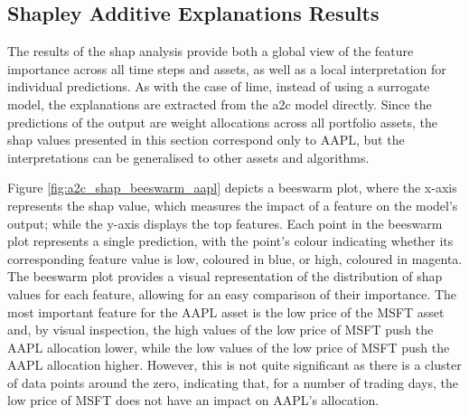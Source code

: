 \subsection{Shapley Additive Explanations Results} \label{sec:shap-results}

The results of the \acrshort{shap} analysis provide both a global view of the feature importance across all time steps and assets, as well as a local interpretation for individual predictions. As with the case of \acrshort{lime}, instead of using a surrogate model, the explanations are extracted from the \acrshort{a2c} model directly. Since the predictions of the output are weight allocations across all portfolio assets, the \acrshort{shap} values presented in this section correspond only to AAPL, but the interpretations can be generalised to other assets and algorithms.

Figure \ref{fig:a2c_shap_beeswarm_aapl} depicts a beeswarm plot, where the x-axis represents the \acrshort{shap} value, which measures the impact of a feature on the model's output; while the y-axis displays the top features. Each point in the beeswarm plot represents a single prediction, with the point's colour indicating whether its corresponding feature value is low, coloured in blue, or high, coloured in magenta. The beeswarm plot provides a visual representation of the distribution of \acrshort{shap} values for each feature, allowing for an easy comparison of their importance. The most important feature for the AAPL asset is the low price of the MSFT asset and, by visual inspection, the high values of the low price of MSFT push the AAPL allocation lower, while the low values of the low price of MSFT push the AAPL allocation higher. However, this is not quite significant as there is a cluster of data points around the zero, indicating that, for a number of trading days, the low price of MSFT does not have an impact on AAPL's allocation. 

